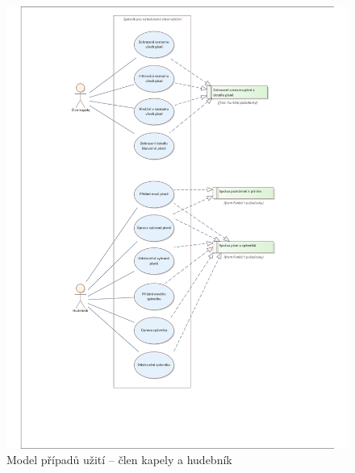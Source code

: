 \begin{figure}
    \includegraphics[width=\textwidth]{images/3-navrh/3-2-uc-model-1.pdf}
    \caption{Model případů užití -- člen kapely a hudebník}
\end{figure}

